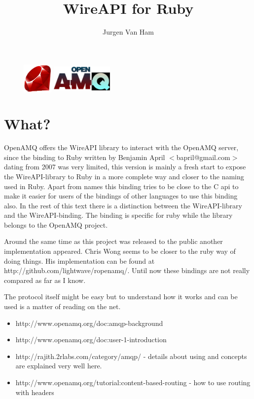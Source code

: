 \documentclass[a4paper,twoside]{article}
\title {WireAPI for Ruby}
\author {Jurgen Van Ham}
\begin{document}
\maketitle
\begin{figure}[htp]
\centering
\includegraphics[width=1.5cm,height=1.5cm]{ruby-logo.eps}
\hspace{1cm}
\includegraphics[width=3cm,height=1.5cm]{openamq-logo.eps}
\end{figure}

\tableofcontents



\section{What?}

OpenAMQ offers the WireAPI library to interact with 
the OpenAMQ server, since the binding to Ruby written by 
Benjamin April $<$bapril@gmail.com$>$ dating from 2007 was very 
limited, this version is mainly a fresh start to expose the 
WireAPI-library to Ruby in a more complete way and closer to the 
naming used in Ruby. Apart from names this binding tries to be
close to the C api to make it easier for users of the bindings
of other languages to use this binding also. In the rest of this 
text there is a  distinction between the 
WireAPI-library and the 
WireAPI-binding. The binding is 
specific for ruby while the library belongs to the OpenAMQ project.

Around the same time as this project was released to the public
another implementation appeared. Chris Wong seems to be closer
to the ruby way of doing things. His implementation can be found
at http://github.com/lightwave/ropenamq/. Until now these bindings
are not really compared as far as I know.

The protocol itself might be easy but to understand how it works
and can be used is a matter of reading on the net.\label{sec:info-url}
\begin{itemize}
\item http://www.openamq.org/doc:amqp-background  
\item http://www.openamq.org/doc:user-1-introduction  
\item http://rajith.2rlabs.com/category/amqp/ - details about using 
  and concepts are explained very well here.
\item http://www.openamq.org/tutorial:content-based-routing - how to use
  routing with headers
\end{itemize}
\end{document}
